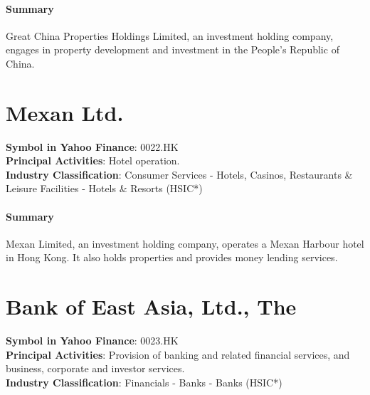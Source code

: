 \paragraph{Summary}
Great China Properties Holdings Limited, an investment holding company, engages in property development and investment in the People's Republic of China.


\section{Mexan Ltd.}
\textbf{Symbol in Yahoo Finance}: 0022.HK\\
\textbf{Principal Activities}: Hotel operation.\\
\textbf{Industry Classification}: Consumer Services - Hotels, Casinos, Restaurants \& Leisure Facilities - Hotels \& Resorts (HSIC*)
\paragraph{Summary}
Mexan Limited, an investment holding company, operates a Mexan Harbour hotel in Hong Kong. It also holds properties and provides money lending services.


\section{Bank of East Asia, Ltd., The}
\textbf{Symbol in Yahoo Finance}: 0023.HK\\
\textbf{Principal Activities}: Provision of banking and related financial services, and business, corporate and investor services.\\
\textbf{Industry Classification}: Financials - Banks - Banks (HSIC*)
